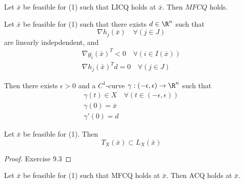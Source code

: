 
Let $\bar x$ be feasible for (1) such that LICQ holds at $\bar x$.
Then $MFCQ$ holds.


Let $\bar x$ be feasible for (1) such that there exists $d\in\R^n$
such that
$$
	\nabla h_j(\bar x)\quad\forall(j\in J)
$$
are linearly indepdendent, and
\begin{gather*}
	\nabla g_i(\bar x)^T < 0  \quad\forall(i\in I(\bar x))\\
	\nabla h_j(\bar x)^Td = 0 \quad\forall(j\in J)
\end{gather*}

Then there exists $\epsilon>0$ and a $C^1$-curve
$\gamma:(-\epsilon,\epsilon)\to\R^n$ such that
\begin{gather*}
	\gamma(t) \in X\quad\forall(t\in(-\epsilon,\epsilon)) \\
	\gamma(0) = \bar x \\
	\gamma'(0)=d
\end{gather*}



Let $\bar x$ be feasible for (1). Then
$$
	T_X(\bar x)\subset L_X(\bar x)
$$

\begin{proof}
	Exercise 9.3
\end{proof}


Let $\bar x$ be feasible for (1) such that MFCQ holds at $\bar x$.
Then ACQ holds at $\bar x$.

